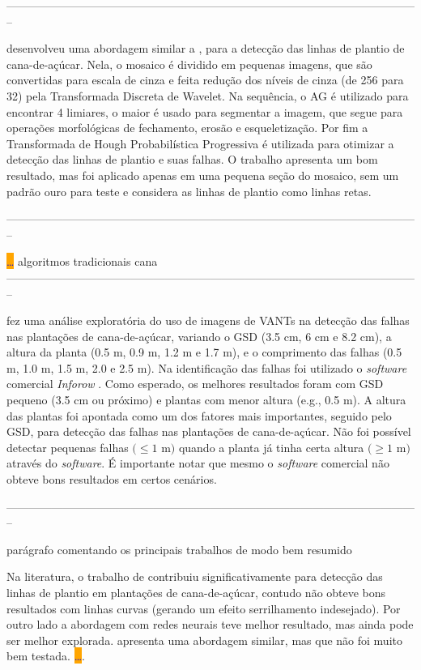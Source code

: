 \documentclass[12pt, a4paper, english, brazil]{article}
\newcommand{\textRed}[1]{{{\color{red} #1}}}
\newcommand{\dotsBlue}{\colorbox{orange}{\textcolor{blue}{\dots}}}
\newcommand{\linePage}{--------------------------------------------------------------------------------------------------------------}
\begin{document}
\linePage

 desenvolveu uma abordagem similar a , para a detecção das linhas de plantio de cana-de-açúcar. Nela, o mosaico é dividido em pequenas imagens, que são convertidas para escala de cinza e feita redução dos níveis de cinza (de 256 para 32) pela Transformada Discreta de Wavelet. Na sequência, o AG é utilizado para encontrar 4 limiares, o maior é usado para segmentar a imagem, que segue para operações morfológicas de fechamento, erosão e esqueletização. Por fim a Transformada de Hough Probabilística Progressiva é utilizada para otimizar a detecção das linhas de plantio e suas falhas. O trabalho apresenta um bom resultado, mas foi aplicado apenas em uma pequena seção do mosaico, sem um padrão ouro para teste e considera as linhas de plantio como linhas retas.

\linePage

 \dotsBlue
algoritmos tradicionais
cana
\linePage

 fez uma análise exploratória do uso de imagens de VANTs na detecção das falhas nas plantações de cana-de-açúcar, variando o GSD (3.5 cm, 6 cm e 8.2 cm), a altura da planta (0.5 m, 0.9 m, 1.2 m e 1.7 m), e o comprimento das falhas (0.5 m, 1.0 m, 1.5 m, 2.0 e 2.5 m). Na identificação das falhas foi utilizado o \textit{software} comercial \textit{Inforow} \cite{Inforow_2021}. Como esperado, os melhores resultados foram com GSD pequeno (3.5 cm ou próximo) e plantas com menor altura (e.g., 0.5 m). A altura das plantas foi apontada como um dos fatores mais importantes, seguido pelo GSD, para detecção das falhas nas plantações de cana-de-açúcar. Não foi possível detectar pequenas falhas $(\le 1$ m$)$ quando a planta já tinha certa altura $(\ge 1$ m$)$ através do \textit{software}. É importante notar que mesmo o \textit{software} comercial não obteve bons resultados em certos cenários.

\linePage

\textRed{parágrafo comentando os principais trabalhos de modo bem resumido}

Na literatura, o trabalho de  contribuiu significativamente para detecção das linhas de plantio em plantações de cana-de-açúcar, contudo não obteve bons resultados com linhas curvas (gerando um efeito serrilhamento indesejado). Por outro lado a abordagem com redes neurais teve melhor resultado, mas ainda pode ser melhor explorada.  apresenta uma abordagem similar, mas que não foi muito bem testada.  \dotsBlue.
\end{document}

